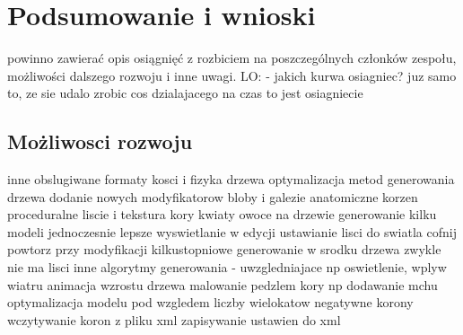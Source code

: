 

\chapter{Podsumowanie i wnioski}
powinno zawierać opis osiągnięć z rozbiciem na poszczególnych
członków zespołu, możliwości dalszego rozwoju i inne uwagi.
LO: - jakich kurwa osiagniec? juz samo to, ze sie udalo zrobic cos dzialajacego na czas to jest osiagniecie
\section{Możliwosci rozwoju}
inne obslugiwane formaty
kosci i fizyka drzewa
optymalizacja metod generowania drzewa
dodanie nowych modyfikatorow
bloby i galezie anatomiczne
korzen
proceduralne liscie i tekstura kory
kwiaty owoce na drzewie
generowanie kilku modeli jednoczesnie
lepsze wyswietlanie w edycji
ustawianie lisci do swiatla
cofnij powtorz przy modyfikacji
kilkustopniowe generowanie
w srodku drzewa zwykle nie ma lisci 
inne algorytmy generowania  - uwzgledniajace np oswietlenie, wplyw wiatru
animacja wzrostu drzewa
malowanie pedzlem kory np dodawanie mchu
optymalizacja modelu pod wzgledem liczby wielokatow
negatywne korony
wczytywanie koron z pliku xml
zapisywanie ustawien do xml

